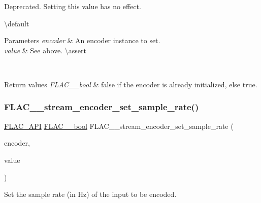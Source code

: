 Deprecated. Setting this value has no effect.

\textbackslash{}default {} 
\begin{DoxyParams}{Parameters}
{\em encoder} & An encoder instance to set. \\
\hline
{\em value} & See above. \textbackslash{}assert 
\begin{DoxyCode}{1}
\end{DoxyCode}
 \\
\hline
\end{DoxyParams}

\begin{DoxyRetVals}{Return values}
{\em F\+L\+A\+C\+\_\+\+\_\+bool} & {\ttfamily false} if the encoder is already initialized, else {\ttfamily true}. \\
\hline
\end{DoxyRetVals}
\mbox{\label{group__flac__stream__encoder_ga108c3f4fbdcaa744ddbb125f91cb3838}} 
\subsubsection{\texorpdfstring{FLAC\_\_stream\_encoder\_set\_sample\_rate()}{FLAC\_\_stream\_encoder\_set\_sample\_rate()}}
{\footnotesize\ttfamily \mbox{\hyperlink{group__flac__export_ga56ca07df8a23310707732b1c0007d6f5}{F\+L\+A\+C\+\_\+\+A\+PI}} \mbox{\hyperlink{ordinals_8h_a95103469f1cbd78b8cf250194985b34e}{F\+L\+A\+C\+\_\+\+\_\+bool}} F\+L\+A\+C\+\_\+\+\_\+stream\+\_\+encoder\+\_\+set\+\_\+sample\+\_\+rate (\begin{DoxyParamCaption}\item[{\mbox{\hyperlink{struct_f_l_a_c_____stream_encoder}{F\+L\+A\+C\+\_\+\+\_\+\+Stream\+Encoder}} $\ast$}]{encoder,  }\item[{unsigned}]{value }\end{DoxyParamCaption})}

Set the sample rate (in Hz) of the input to be encoded.

